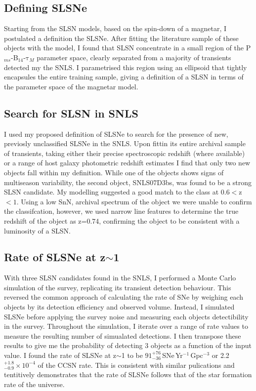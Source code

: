 \subsection{Defining SLSNe}
Starting from the SLSN models, based on the spin-down of a magnetar, I postulated a definition the SLSNe. After fitting the literature sample of these objects with the model, I found that SLSN concentrate in a small region of the P$_{ms}$-B$_{14}$-$\mathrm{\tau}_M$ parameter space, clearly separated from a majority of transients detected my the SNLS. I parametrised this region using an ellipsoid that tightly encapsules the entire training sample, giving a definition of a SLSN in terms of the parameter space of the magnetar model.

\subsection{Search for SLSN in SNLS}
I used my proposed definition of SLSNe to search for the presence of new, previosly unclassified SLSNe in the SNLS. Upon fittin its entire archival sample of transients, taking either their precise spectroscopic redshift (where available) or a range of host galaxy photometric redshift estimates I find that only two new objects fall within my definition. While one of the objects shows signs of multiseason variability, the second object, SNLS07D3bs, was found to be a strong SLSN candidate. My modelling suggested a good match to the class at 0.6$<$z$<1$. Using a low Sn\/N, archival spectrum of the object we were unable to confirm the classifcation, however, we used narrow line features to determine the true redshift of the object as z=0.74, confirming the object to be consistent with a luminosity of a SLSN.

\subsection{Rate of SLSNe at z$\sim$1}
With three SLSN candidates found in the SNLS, I performed a Monte Carlo simulation of the survey, replicating its transient detection behaviour. This reversed the common approach of calculating the rate of SNe by weighing each objects by its detection efficiency and observed volume. Instead, I simulated SLSNe before applying the survey noise and measuring each objects detectibility in the survey. Throughout the simulation, I iterate over a range of rate values to measure the resulting number of simualated detections. I then transpose these results to give me the probability of detecting 3 objects as a function of the input value. I found the rate of SLSNe at z$\sim$1 to be $91^{+76}_{-36}$\,SNe\,Yr$^{-1}$\,Gpc$^{-3}$ or 2.2$^{+1.8}_{-0.9}\times10^{-4}$ of the CCSN rate. This is consistent with similar pulications and tentitively demonstrates that the rate of SLSNe follows that of the star formation rate of the universe.

